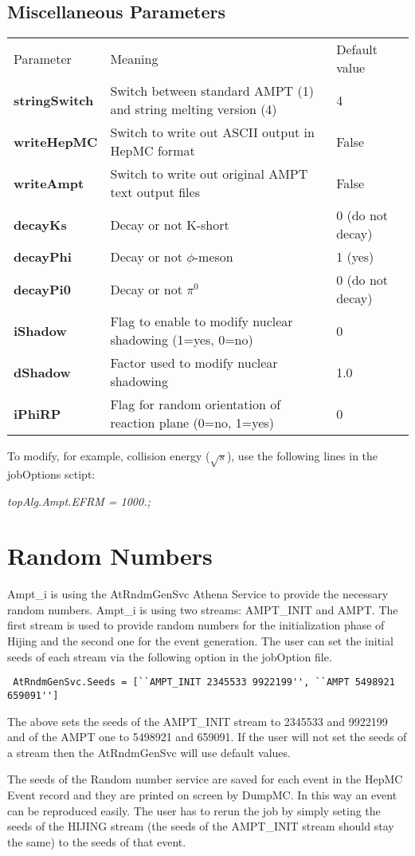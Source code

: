\documentclass[11pt]{article}
\begin{document}
\subsection{Miscellaneous Parameters}

\begin{tabular}{lll}
Parameter & Meaning & Default value \\
{\bf stringSwitch} & Switch between standard AMPT (1) and string melting version (4)  &    4 \\
{\bf writeHepMC}  & Switch to write out ASCII output in HepMC format            &       False \\
{\bf writeAmpt}  & Switch to write out original AMPT text output files       &          False \\
{\bf decayKs}  & Decay or not K-short    &    0 (do not decay) \\
{\bf decayPhi}  & Decay or not $\phi$-meson   &     1 (yes) \\
{\bf decayPi0}  & Decay or not $\pi^0$    &    0 (do not decay) \\
{\bf iShadow}   & Flag to enable to modify nuclear shadowing (1=yes, 0=no)  &  0  \\
{\bf dShadow}  & Factor used to modify nuclear shadowing   &  1.0 \\
{\bf iPhiRP}   & Flag for random orientation of reaction plane (0=no, 1=yes) &  0 \\
\end{tabular}

\bigskip

To modify, for example, collision energy ($\sqrt{s}$), use the following lines in the jobOptions sctipt:

{\em topAlg.Ampt.EFRM = 1000.; }



\section {Random Numbers}

Ampt\_i is using the AtRndmGenSvc Athena Service to provide the necessary random numbers.
Ampt\_i is using two streams: AMPT\_INIT and AMPT. The first stream is used to provide
 random numbers for the initialization phase of Hijing and the second one for the event generation. The user
 can set the initial seeds of each stream via the following option in the jobOption file.

 \begin{verbatim} 
 AtRndmGenSvc.Seeds = [``AMPT_INIT 2345533 9922199'', ``AMPT 5498921 659091'']
 \end{verbatim}

 The above sets the seeds of the AMPT\_INIT stream to 2345533 and 9922199 and of the AMPT one to
 5498921 and 659091. If the user will not set the seeds of a stream then the AtRndmGenSvc will use default
 values.

 The seeds of the Random number service are saved for each event in the HepMC Event record and they are printed
 on screen by DumpMC. In this way an event can be reproduced easily. The user has to rerun the job by simply seting
 the seeds of the HIJING stream (the seeds of the AMPT\_INIT stream should stay the same) to the seeds of that
 event.

 
\end{document}
